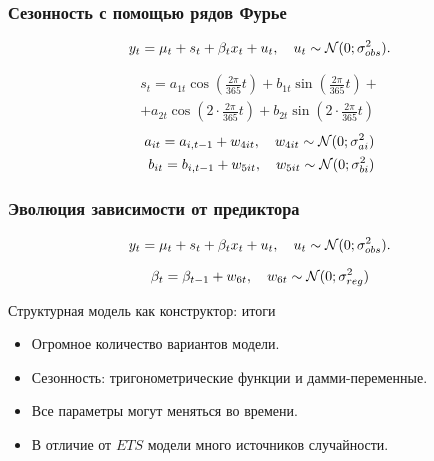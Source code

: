   
  \begin{frame}
    \frametitle{Сезонность с помощью рядов Фурье}
    \[
    y_t = \mu_t + s_t + \beta_t x_t +  u_t, \quad u_t \sim \mathcal{N}(0; \sigma^2_{obs}).  
    \]
  
    \pause
    \begin{eqnarray*}
       s_t = a_{1t} \cos(\frac{2\pi}{365} t) + b_{1t} \sin(\frac{2\pi}{365} t) + \\
           + a_{2t} \cos(2\cdot \frac{2\pi}{365} t) + b_{2t} \sin(2\cdot\frac{2\pi}{365} t)
    \end{eqnarray*}
    \pause
    \begin{eqnarray*}
      a_{it} = a_{i,t-1} + w_{4it}, \quad w_{4it} \sim \mathcal{N}(0;\sigma^2_{ai}) \\
      b_{it} = b_{i,t-1} + w_{5it}, \quad w_{5it} \sim \mathcal{N}(0;\sigma^2_{bi})
    \end{eqnarray*}
    
  \end{frame}
  
  \begin{frame}
    \frametitle{Эволюция зависимости от предиктора}
    \[
    y_t = \mu_t + s_t + \beta_t x_t +  u_t, \quad u_t \sim \mathcal{N}(0; \sigma^2_{obs}).  
    \]
  
    \pause
    \[
       \beta_{t} = \beta_{t-1} + w_{6t}, \quad  w_{6t} \sim \mathcal{N}(0;\sigma^2_{reg})
    \]
    
  \end{frame}
  
  

  \begin{frame}{Структурная модель как конструктор: итоги}

    \begin{itemize}[<+->]
      \item Огромное количество \alert{вариантов модели}.
    \item Сезонность: \alert{тригонометрические функции} и \alert{дамми-переменные}.
      \item Все параметры могут \alert{меняться} во времени.
      \item В отличие от $ETS$ модели \alert{много источников} случайности. 
    \end{itemize}
  \end{frame}
  